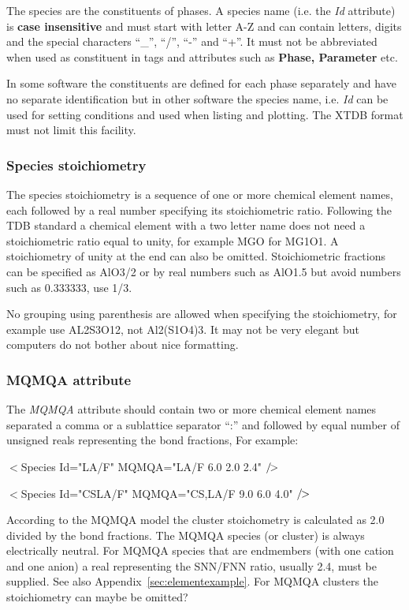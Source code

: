 \documentclass{article}
\newcommand\eoxml{/\hspace{-4pt}>}
\begin{document}
The species are the constituents of phases.  A species name (i.e. the
{\em Id} attribute) is {\bf case insensitive} and must start with
letter A-Z and can contain letters, digits and the special characters
``\_'', ``/'', ``-'' and ``+''.  It must not be abbreviated when used
as constituent in tags and attributes such as {\bf Phase, Parameter}
etc. 

In some software the constituents are defined for each phase
separately and have no separate identification but in other software
the species name, i.e. {\em Id} can be used for setting conditions and
used when listing and plotting.  The XTDB format must not limit this
facility.

\subsubsection{Species stoichiometry}\label{sec:speciesSS}

The species stoichiometry is a sequence of one or more chemical
element names, each followed by a real number specifying its
stoichiometric ratio.  Following the TDB standard a chemical element
with a two letter name does not need a stoichiometric ratio equal to
unity, for example MGO for MG1O1.  A stoichiometry of unity at the end
can also be omitted.  Stoichiometric fractions can be specified as
AlO3/2 or by real numbers such as AlO1.5 but avoid numbers such as
0.333333, use 1/3.

No grouping using parenthesis are allowed when specifying the
stoichiometry, for example use AL2S3O12, not Al2(S1O4)3.  It may not
be very elegant but computers do not bother about nice formatting.

\subsubsection{MQMQA attribute}\label{sec:mqmqa}
The {\em MQMQA} attribute should contain two or more chemical element
names separated a comma or a sublattice separator ``:'' and followed
by equal number of unsigned reals representing the bond fractions, For
example:

  $<$Species Id="LA/F"    MQMQA="LA/F     6.0 2.0 2.4" $\eoxml$

  $<$Species Id="CSLA/F"  MQMQA="CS,LA/F  9.0 6.0 4.0" $\eoxml$

According to the MQMQA model the cluster stoichometry is calculated as
2.0 divided by the bond fractions.  The MQMQA species (or cluster) is
always electrically neutral.  For MQMQA species that are endmembers
(with one cation and one anion) a real representing the SNN/FNN ratio,
usually 2.4, must be supplied.  See also
Appendix~\ref{sec:elementexample}.  For MQMQA clusters the
stoichiometry can maybe be omitted?
\end{document}
